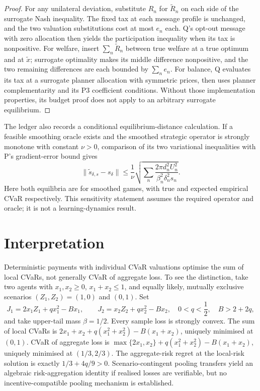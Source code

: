\documentclass{article}
\begin{document}
\begin{proof}
For any unilateral deviation, substitute \(R_n\) for \(\widetilde R_n\) on each side of the surrogate Nash inequality. The fixed tax at each message profile is unchanged, and the two valuation substitutions cost at most \(e_n\) each. Q's opt-out message with zero allocation then yields the participation inequality when its tax is nonpositive. For welfare, insert \(\sum_n\widetilde R_n\) between true welfare at a true optimum and at \(\widetilde x\); surrogate optimality makes its middle difference nonpositive, and the two remaining differences are each bounded by \(\sum_n e_n\). For balance, Q evaluates its tax at a surrogate planner allocation with symmetric prices, then uses planner complementarity and its P3 coefficient conditions. Without those implementation properties, its budget proof does not apply to an arbitrary surrogate equilibrium. %
\end{proof}

The ledger also records a conditional equilibrium-distance calculation. If a feasible smoothing oracle exists and the smoothed strategic operator is strongly monotone with constant \(\nu>0\), comparison of its two variational inequalities with P's gradient-error bound gives
\[
\|\widetilde s_{\delta,s}-s_{\delta}\|
\leq\frac{1}{\nu}\sqrt{\sum_n
\frac{2\pi d_n^2U_n^2}{\beta_n^2\delta_n^2s_n}}.
\]
Here both equilibria are for smoothed games, with true and expected empirical CVaR respectively. This sensitivity statement assumes the required operator and oracle; it is not a learning-dynamics result. %

\section{Interpretation}

Deterministic payments with individual CVaR valuations optimise the sum of local CVaRs, not generally CVaR of aggregate loss. To see the distinction, take two agents with \(x_1,x_2\geq0\), \(x_1+x_2\leq1\), and equally likely, mutually exclusive scenarios \((Z_1,Z_2)=(1,0)\) and \((0,1)\). Set
\[
J_1=2x_1Z_1+qx_1^2-Bx_1,\qquad
J_2=x_2Z_2+qx_2^2-Bx_2,
\quad 0<q<\frac12,\quad B>2+2q,
\]
and take upper-tail mass \(\beta=1/2\). Every sample loss is strongly convex. The sum of local CVaRs is \(2x_1+x_2+q(x_1^2+x_2^2)-B(x_1+x_2)\), uniquely minimised at \((0,1)\). CVaR of aggregate loss is \(\max\{2x_1,x_2\}+q(x_1^2+x_2^2)-B(x_1+x_2)\), uniquely minimised at \((1/3,2/3)\). The aggregate-risk regret at the local-risk solution is exactly \(1/3+4q/9>0\). Scenario-contingent pooling transfers yield an algebraic risk-aggregation identity if realised losses are verifiable, but no incentive-compatible pooling mechanism is established. %
\end{document}
